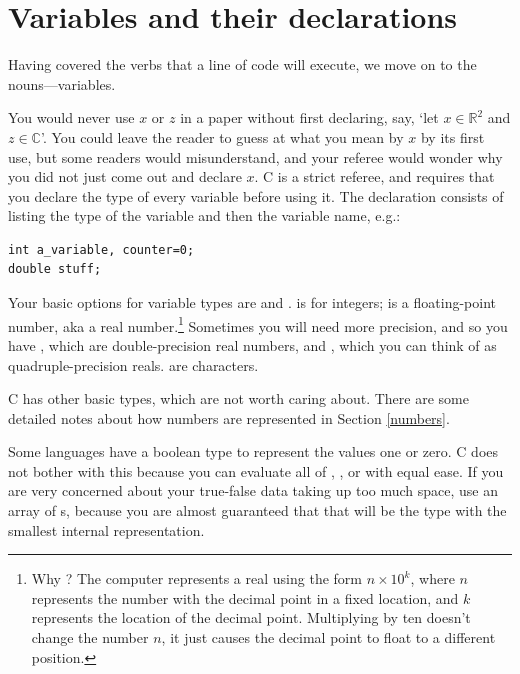\section{Variables and their declarations} \label{declaring}

Having covered the verbs that a line of code will execute, we move on
to the nouns---variables. 

You would never use $x$ or $z$ in a paper without first declaring,
say, `let $x \in {\mathbb R}^2$ and $z \in {\mathbb C}$'. You could
leave the reader to guess at what you mean by $x$ by its first use,
but some readers would misunderstand, and your referee would wonder why
you did not just come out and declare $x$. C is a strict referee, and
requires that you declare the type of every variable before using it.
The declaration consists of listing the type of the variable and then
the variable name, e.g.:

\begin{lstlisting}
int a_variable, counter=0;
double stuff;
\end{lstlisting}


Your basic options for variable types are  
and .  is for integers;
 is a floating-point number, aka a real number.\footnote{Why ? The
computer represents a real using the form $n \times 10^k$, where $n$
represents the number with the decimal point in a fixed location,
and $k$ represents the location of the decimal point.  Multiplying by
ten doesn't change the number $n$, it just causes the decimal point to
float to a different position.} Sometimes you will need more precision,
and so you have , which are double-precision real numbers,
and , which you can think of as quadruple-precision
reals.  are characters.	

C has other basic types, which are not worth caring about. There
are some detailed notes about how numbers are represented in Section
\ref{numbers}.

Some languages have a boolean type to represent the values one or zero.
C does not bother with this because you can
evaluate all of , , or 
with equal ease. If you are very concerned about 
your true-false data taking up too much space, use an array of s,
because you are almost guaranteed that that will be the type with the
smallest internal representation.

